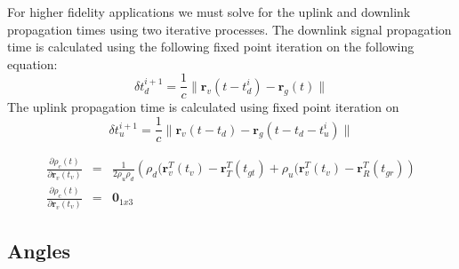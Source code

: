   For higher fidelity applications we must solve for the uplink and downlink
  propagation times using two iterative processes.  The downlink signal propagation
  time is calculated using the following fixed point iteration on the following equation:
%
\begin{equation}
     \delta t_d^{i+1} = \frac{1}{c}\| \mathbf{r}_v( t - t_d^{i}) - \mathbf{r}_g(t)   \|
\end{equation}
%
The uplink propagation time is calculated using fixed point
iteration on
%
\begin{equation}
     \delta t_u^{i+1} = \frac{1}{c}\| \mathbf{r}_v( t - t_d) - \mathbf{r}_g(t - t_d - t_u^{i} )   \|
\end{equation}
%

\begin{eqnarray}
     \frac{\partial \rho_c (t)}{\partial \mathbf{r}_v(t_v)} &=& \frac{1}{2\rho_u\rho_d}
     \left( \rho_d(\mathbf{r}_v^T(t_v) - \mathbf{r}_T^T(t_{gt}) + \rho_u(\mathbf{r}_v^T(t_v) - \mathbf{r}_R^T(t_{gr}  ) \right)\\
     \frac{\partial \rho_c (t)}{\partial \dot{\mathbf{r}}_v(t_v)} &=& \mathbf{0}_{1x3}
\end{eqnarray}

\subsection{Angles}
